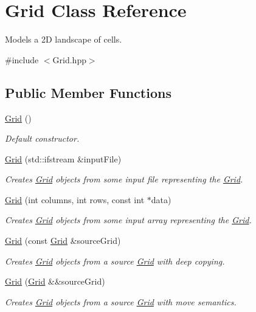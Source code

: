 \hypertarget{class_grid}{}\section{Grid Class Reference}
\label{class_grid}


Models a 2D landscape of cells.  




{\ttfamily \#include $<$Grid.\+hpp$>$}

\subsection*{Public Member Functions}
\begin{DoxyCompactItemize}
\item 
\hyperlink{class_grid_a4ac9ff4f63552b4c61ff90fcb35ad66c}{Grid} ()
\begin{DoxyCompactList}\small\item\em Default constructor. \end{DoxyCompactList}\item 
\hyperlink{class_grid_a88ab1ccc8100827b4da40e62b7b77e96}{Grid} (std\+::ifstream \&input\+File)
\begin{DoxyCompactList}\small\item\em Creates \hyperlink{class_grid}{Grid} objects from some input file representing the \hyperlink{class_grid}{Grid}. \end{DoxyCompactList}\item 
\hyperlink{class_grid_a9422d584f13d6e3bba52d3e15b3aecae}{Grid} (int columns, int rows, const int $\ast$data)
\begin{DoxyCompactList}\small\item\em Creates \hyperlink{class_grid}{Grid} objects from some input array representing the \hyperlink{class_grid}{Grid}. \end{DoxyCompactList}\item 
\hyperlink{class_grid_a2be5432331273bc420c252ea09631965}{Grid} (const \hyperlink{class_grid}{Grid} \&source\+Grid)
\begin{DoxyCompactList}\small\item\em Creates \hyperlink{class_grid}{Grid} objects from a source \hyperlink{class_grid}{Grid} with deep copying. \end{DoxyCompactList}\item 
\hyperlink{class_grid_a3828d0bf34f6c97ed93adc84d4ce6c4b}{Grid} (\hyperlink{class_grid}{Grid} \&\&source\+Grid)
\begin{DoxyCompactList}\small\item\em Creates \hyperlink{class_grid}{Grid} objects from a source \hyperlink{class_grid}{Grid} with move semantics. \end{DoxyCompactList}\item 

\end{DoxyCompactItemize}
